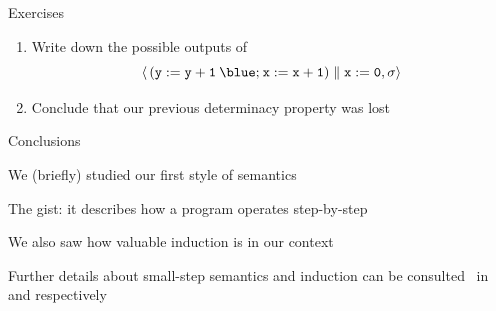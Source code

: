 \documentclass{beamer}
\begin{document}
\begin{frame}{Exercises}

        \begin{enumerate}
                \item Write down the possible outputs of 
                        \[
                        \pv{\, (\prog{y := y +1} \> {\blue ;}  \>  \prog{x := x + 1}) 
                        \parallel \prog{x := 0}}{\sigma}
                        \]
                \item Conclude that our previous determinacy property was lost
        \end{enumerate}
\end{frame}

\begin{frame}{Conclusions}

        We (briefly) studied our first style of semantics

        The gist: it describes how a program operates step-by-step

        We also saw how valuable induction is in our context

        \pause
        \vfill
        Further details about small-step semantics and induction can be
        consulted \eg\ in \cite[Chapter 6]{reynolds98} and \cite[Chapter
        3]{winskel93} respectively
\end{frame}


\end{document}
